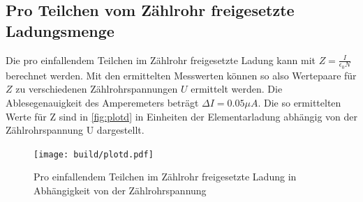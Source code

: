   \subsection{Pro Teilchen vom Zählrohr freigesetzte Ladungsmenge}
  Die pro einfallendem Teilchen im Zählrohr freigesetzte Ladung kann mit $Z=\frac{I}{\epsilon_0 N}$ berechnet werden. Mit den ermittelten Messwerten können so also Wertepaare für $Z$ zu verschiedenen Zählrohrspannungen $U$ ermittelt werden. Die Ablesegenauigkeit des Amperemeters beträgt $\Delta I= 0.05 \mu A$. Die so ermittelten Werte für Z sind in \autoref{fig:plotd} in Einheiten der Elementarladung abhängig von der Zählrohrspannung U dargestellt.
  \begin{figure}
    \centering
    \texttt{[image: build/plotd.pdf]}
    \caption{Pro einfallendem Teilchen im Zählrohr freigesetzte Ladung in Abhängigkeit von der Zählrohrspannung}
    \label{fig:plotd}
  \end{figure}
